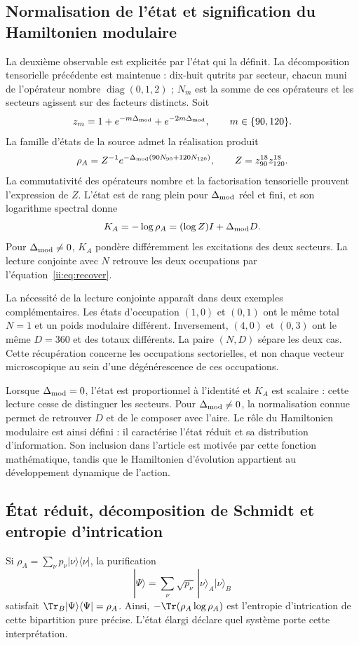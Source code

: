 \subsection{Normalisation de l'état et signification du Hamiltonien modulaire}
La deuxième observable est explicitée par l'état qui la définit.
La décomposition tensorielle précédente est maintenue : dix-huit qutrits
par secteur, chacun muni de l'opérateur nombre $\operatorname{diag}(0,1,2)$ ;
$N_m$ est la somme de ces opérateurs et les secteurs agissent sur des facteurs
distincts. Soit
\[
 z_m=1+e^{-m\Delta_{\rm mod}}+e^{-2m\Delta_{\rm mod}},
 \qquad m\in\{90,120\}.
\]
La famille d'états de la source admet la réalisation produit
\[
 \rho_A=Z^{-1}e^{-\Delta_{\rm mod}(90N_{90}+120N_{120})},
 \qquad Z=z_{90}^{18}z_{120}^{18}.
\]
La commutativité des opérateurs nombre et la factorisation tensorielle
prouvent l'expression de $Z$. L'état est de rang plein pour
$\Delta_{\rm mod}$ réel et fini, et son logarithme spectral donne
\[
 K_A=-\log\rho_A=(\log Z)I+\Delta_{\rm mod}D.
\]
Pour $\Delta_{\rm mod}\ne0$, $K_A$ pondère différemment les excitations
des deux secteurs. La lecture conjointe avec $N$ retrouve les deux occupations
par l'équation~\eqref{ii:eq:recover}.

La nécessité de la lecture conjointe apparaît dans deux exemples complémentaires.
Les états d'occupation $(1,0)$ et $(0,1)$ ont le même total $N=1$
et un poids modulaire différent. Inversement, $(4,0)$ et $(0,3)$ ont
le même $D=360$ et des totaux différents. La paire $(N,D)$ sépare les deux
cas. Cette récupération concerne les occupations sectorielles, et non
chaque vecteur microscopique au sein d'une dégénérescence de ces occupations.

Lorsque $\Delta_{\rm mod}=0$, l'état est proportionnel à l'identité
et $K_A$ est scalaire : cette lecture cesse de distinguer les secteurs.
Pour $\Delta_{\rm mod}\ne0$, la normalisation connue permet de retrouver
$D$ et de le composer avec l'aire. Le rôle du Hamiltonien
modulaire est ainsi défini : il caractérise l'état réduit et sa distribution d'information.
Son inclusion dans l'article est motivée par cette fonction mathématique,
tandis que le Hamiltonien d'évolution appartient au développement dynamique
de l'action.



\subsection{État réduit, décomposition de Schmidt et entropie d'intrication}
Si $\rho_A=\sum_\nu p_\nu|\nu\rangle\langle\nu|$,
la purification
\[
|\Psi\rangle=\sum_\nu\sqrt{p_\nu}\,
|\nu\rangle_A|\nu\rangle_B
\]
satisfait $\Tr_B|\Psi\rangle\langle\Psi|=\rho_A$.
Ainsi, $-\Tr(\rho_A\log\rho_A)$ est l'entropie d'intrication
de cette bipartition pure précise. L'état élargi déclare
quel système porte cette interprétation.

